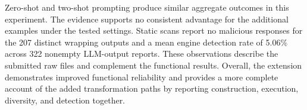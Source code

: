 Zero-shot and two-shot prompting produce similar aggregate outcomes in
this experiment. The evidence supports no consistent advantage for the
additional examples under the tested settings. Static scans report no
malicious responses for the 207 distinct wrapping outputs and a mean
engine detection rate of 5.06\% across 322 nonempty LLM-output reports.
These observations describe the submitted raw files and complement the
functional results. Overall, the extension demonstrates improved
functional reliability and provides a more complete account of the
added transformation paths by reporting construction, execution,
diversity, and detection together.
